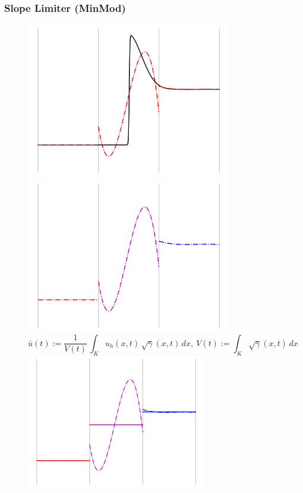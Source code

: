 \documentclass{beamer}
\begin{document}
%
%

\begin{frame}
\frametitle{Slope Limiter (MinMod)}

  \begin{figure}
    \begin{overprint}
        \centering\includegraphics[width=0.8\textwidth]{./fig.sl_01.png}
        \centering\includegraphics[width=0.8\textwidth]{./fig.sl_02.png}
        $$\bar{u}\left(t\right)
        := \frac{1}{V\left(t\right)} \,
        \int_{K} u_{h}\left(x,t\right) \, \sqrt{\gamma}\left(x,t\right) \, dx,
        \ V\left(t\right) := \int_{K} \sqrt{\gamma}\left(x,t\right) \, dx$$
        \centering\includegraphics[width=0.7\textwidth]{./fig.sl_03.png}

\end{overprint}
\end{figure}
\end{frame}
\end{document}
